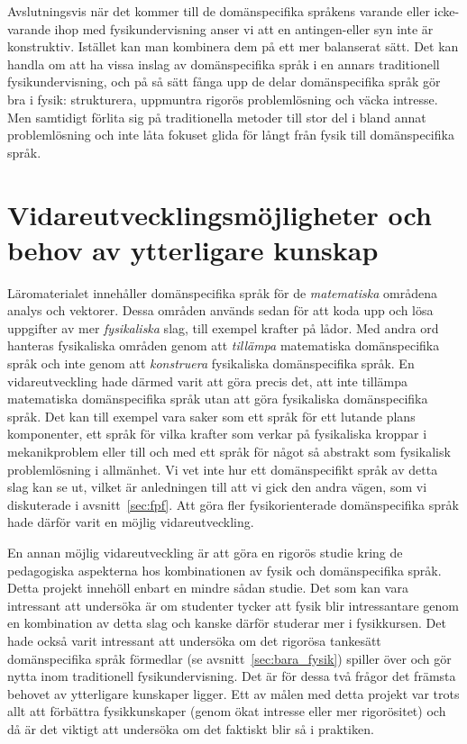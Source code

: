 Avslutningsvis när det kommer till de domänspecifika språkens varande eller
icke-varande
ihop med fysikundervisning anser vi att en antingen-eller syn inte är konstruktiv.
Istället kan man kombinera dem på ett mer balanserat sätt. Det kan handla om att ha
vissa inslag av domänspecifika språk i en annars traditionell fysikundervisning,
och på så sätt fånga upp de delar domänspecifika språk gör bra i fysik:
strukturera, uppmuntra rigorös problemlösning och väcka intresse. Men samtidigt
förlita sig på traditionella metoder till stor del i bland annat problemlösning
och inte låta fokuset glida för långt från fysik till domänspecifika språk.

\section{Vidareutvecklingsmöjligheter och behov av ytterligare kunskap}

Läromaterialet innehåller domänspecifika språk för de \textit{matematiska}
områdena analys och vektorer. Dessa områden används sedan för att koda upp och
lösa uppgifter av mer \textit{fysikaliska} slag, till exempel krafter på lådor. Med andra ord hanteras fysikaliska områden genom att \textit{tillämpa} matematiska domänspecifika språk och inte genom att \textit{konstruera} fysikaliska domänspecifika språk. En vidareutveckling
hade därmed varit att göra precis det, att inte tillämpa matematiska
domänspecifika språk utan att göra fysikaliska domänspecifika språk. Det kan till exempel vara
saker som ett språk för ett lutande plans komponenter, ett språk för vilka krafter som verkar på fysikaliska kroppar i mekanikproblem eller till och med ett språk för något så abstrakt som
fysikalisk problemlösning i allmänhet. Vi vet inte hur ett domänspecifikt språk
av detta slag kan se ut, vilket är anledningen till att vi gick den andra vägen,
som vi diskuterade i avsnitt~\ref{sec:fpf}. Att göra fler fysikorienterade
domänspecifika språk hade därför varit en möjlig vidareutveckling.

En annan möjlig vidareutveckling är att göra en rigorös studie kring de
pedagogiska aspekterna hos kombinationen av fysik och domänspecifika språk.
Detta projekt innehöll enbart en mindre sådan studie. Det som kan vara
intressant att undersöka är om studenter tycker att fysik blir intressantare
genom en kombination av detta slag och kanske därför studerar mer i fysikkursen.
Det hade också varit intressant att undersöka om det rigorösa tankesätt
domänspecifika språk förmedlar (se avsnitt~\ref{sec:bara_fysik}) spiller över och
gör nytta inom traditionell fysikundervisning. Det är för dessa två frågor det
främsta behovet av ytterligare kunskaper ligger. Ett av målen med detta projekt var trots allt att förbättra fysikkunskaper (genom ökat intresse eller mer
rigorösitet) och då är det viktigt att undersöka om det faktiskt blir
så i praktiken.

